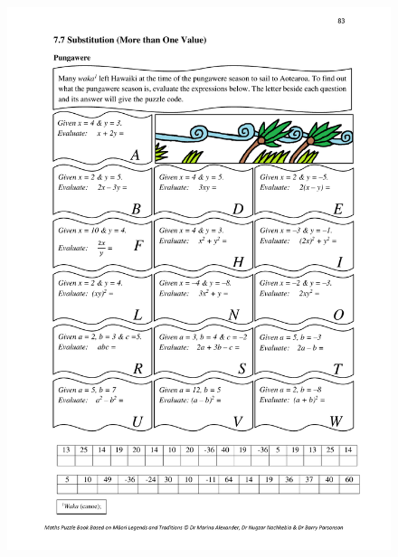 \documentclass[a4paper,12pt]{article}
\begin{document}
\begin{figure}[!h]
	\centering
	\includegraphics[width=16cm]{Qartu/Q7_Expressions_7.pdf}
\end{figure}
\newpage
\end{document}
